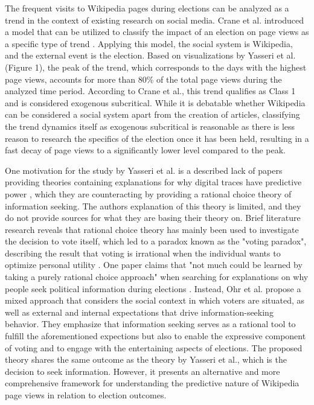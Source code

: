 The frequent visits to Wikipedia pages during elections can be analyzed as a trend in the context of existing research on social media. Crane et al. introduced a model that can be utilized to classify the impact of an election on page views as a specific type of trend \cite{Crane2008Oct}. Applying this model, the social system is Wikipedia, and the external event is the election. Based on visualizations by Yasseri et al. (Figure 1), the peak of the trend, which corresponds to the days with the highest page views, accounts for more than 80\% of the total page views during the analyzed time period. According to Crane et al., this trend qualifies as Class 1 and is considered exogenous subcritical. While it is debatable whether Wikipedia can be considered a social system apart from the creation of articles, classifying the trend dynamics itself as exogenous subcritical is reasonable as there is less reason to research the specifics of the election once it has been held, resulting in a fast decay of page views to a significantly lower level compared to the peak.
\par
One motivation for the study by Yasseri et al. is a described lack of papers providing theories containing explanations for why digital traces have predictive power \cite{Lazer2009Feb}, which they are counteracting by providing a rational choice theory of information seeking. The authors explanation of this theory is limited, and they do not provide sources for what they are basing their theory on. Brief literature research reveals that rational choice theory has mainly been used to investigate the decision to vote itself, which led to a paradox known as the "voting paradox", describing the result that voting is irrational when the individual wants to optimize personal utility \cite{Bendor2003May, Martorana2011Nov}. One paper claims that "not much could be learned by taking a purely rational choice approach" when searching for explanations on why people seek political information during elections \cite{Ohr2001Dec}. Instead,  Ohr et al. propose a mixed approach that considers the social context in which voters are situated, as well as external and internal expectations that drive information-seeking behavior. They emphasize that information seeking serves as a rational tool to fulfill the aforementioned expections but also to enable the expressive component of voting and to engage with the entertaining aspects of elections. The proposed theory shares the same outcome as the theory by Yasseri et al., which is the decision to seek information. However, it presents an alternative and more comprehensive framework for understanding the predictive nature of Wikipedia page views in relation to election outcomes. \par
